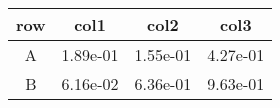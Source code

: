 \begin{tabular}{cccc}
\toprule
row&col1&col2&col3\tabularnewline
\midrule
A&1.89e-01&1.55e-01&4.27e-01\tabularnewline
B&6.16e-02&6.36e-01&9.63e-01\tabularnewline
\bottomrule
\end{tabular}
